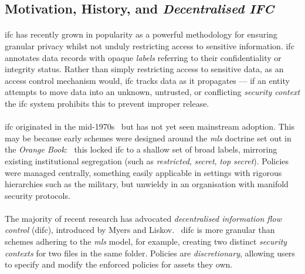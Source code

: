 \subsection{Motivation, History, and \textit{Decentralised IFC}}

\paragraph{} \acrshort{ifc} has recently grown in popularity as a powerful methodology for ensuring granular privacy whilst not unduly restricting access to sensitive information. \acrshort{ifc} annotates data records with opaque \textit{labels} referring to their confidentiality or integrity status. Rather than simply restricting access to sensitive data, as an access control mechanism would, \acrshort{ifc} tracks data as it propagates --- if an entity attempts to move data into an unknown, untrusted, or conflicting \textit{security context} the \acrshort{ifc} system prohibits this to prevent improper release.

\paragraph{} \acrshort{ifc} originated in the mid-1970s~\cite{ifc-lattice} but has not yet seen mainstream adoption. This may be because early schemes were designed around the \textit{\acrfull{mls}} doctrine set out in the \textit{Orange Book}:~\cite{orange-book} this locked \acrshort{ifc} to a shallow set of broad labels, mirroring existing institutional segregation (such as \textit{restricted}, \textit{secret}, \textit{top secret}). Policies were managed centrally, something easily applicable in settings with rigorous hierarchies such as the military, but unwieldy in an organisation with manifold security protocols.

\paragraph{} The majority of recent research has advocated \textit{decentralised information flow control} 
(\acrshort{difc}), introduced by Myers and Liskov.~\cite{difc,10.1145/363516.363526,10.1145/268998.266669} \acrshort{difc} is more granular than schemes adhering to the \textit{\acrshort{mls}} model, for example, creating two distinct \textit{security contexts} for two files in the same folder. Policies are \textit{discretionary}, allowing users to specify and modify the enforced policies for assets they own.

